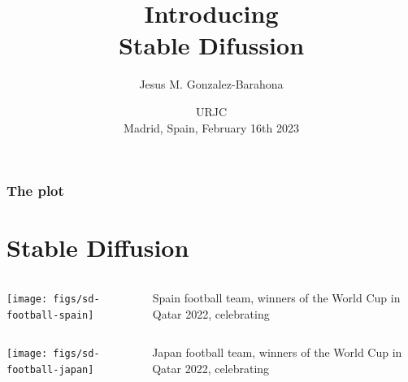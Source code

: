 \documentclass[17pt,aspectratio=169,hyperref={pdfusetitle,colorlinks,allcolors=olive}]{beamer}
\title[Stable Diffusion]{Introducing  \\ Stable Difussion}
\author[Jesus M. Gonzalez-Barahona]{Jesus M. Gonzalez-Barahona}
\institute[URJC]{Universidad Rey Juan Carlos \\
  \url{https://floss.social/@jgbarah} ~~~~~ \url{https://jgbarah.github.io/presentations}}
\date[URJC, 2023]{\small URJC \\
  Madrid, Spain, February 16th 2023}
\begin{document}
\begin{frame}
  \maketitle
\end{frame}



\begin{frame}
  \frametitle{The plot}
\tableofcontents
\end{frame}


\section{Stable Diffusion}

\begin{frame}[fragile]

    \begin{columns}[T]
    \begin{column}{.58\textwidth}
        \texttt{[image: figs/sd-football-spain]}
    \end{column}%
    \hfill%
    \begin{column}{.38\textwidth}
  Spain football team, winners of the World Cup in Qatar 2022, celebrating

    \end{column}%
  \end{columns}

\end{frame}

\begin{frame}[fragile]

    \begin{columns}[T]
    \begin{column}{.58\textwidth}
        \texttt{[image: figs/sd-football-japan]}
    \end{column}%
    \hfill%
    \begin{column}{.38\textwidth}
  Japan football team, winners of the World Cup in Qatar 2022, celebrating

    \end{column}%
  \end{columns}

\end{frame}
\end{document}
